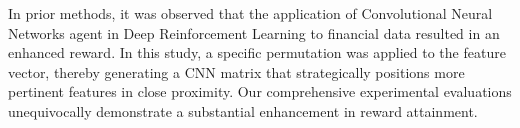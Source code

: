 In prior methods, it was observed that the application of Convolutional Neural Networks agent in Deep Reinforcement Learning to financial data resulted in an enhanced reward.\cite{montazeri2023scnnFinrl} In this study, a specific permutation was applied to the feature vector, thereby generating a CNN matrix that strategically positions more pertinent features in close proximity. Our comprehensive experimental evaluations unequivocally demonstrate a substantial enhancement in reward attainment.